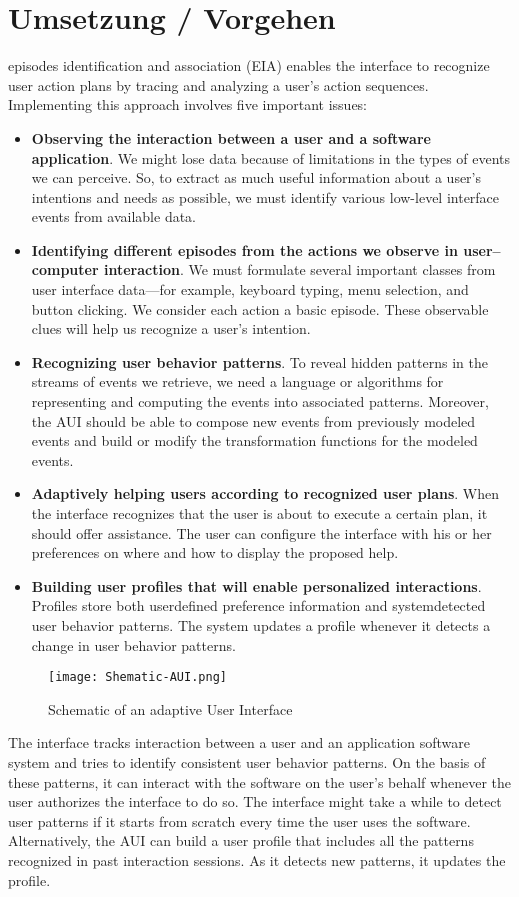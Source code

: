 \chapter{Umsetzung / Vorgehen}
episodes identification and association (EIA) enables the interface to recognize user action plans by tracing
and analyzing a user’s action sequences. Implementing this approach involves five important issues:
\begin{itemize}
    \item \textbf{Observing the interaction between a user and a software application}. We might lose data 
    because of limitations in the types of events we can perceive. So, to extract as much useful
    information about a user’s intentions and needs as possible, we must identify various low-level
    interface events from available data.
    \item \textbf{Identifying different episodes from the actions we observe in user–computer interaction}. We
    must formulate several important classes from user interface data—for example, keyboard
    typing, menu selection, and button clicking. We consider each action a basic episode. These
    observable clues will help us recognize a user’s intention.
    \item \textbf{Recognizing user behavior patterns}. To reveal hidden patterns in the streams of events we
    retrieve, we need a language or algorithms for representing and computing the events into
    associated patterns. Moreover, the AUI should be able to compose new events from previously
    modeled events and build or modify the transformation functions for the modeled events.
    \item \textbf{Adaptively helping users according to recognized user plans}. When the interface recognizes
    that the user is about to execute a certain plan, it should offer assistance. The user can configure
    the interface with his or her preferences on where and how to display the proposed help.
    \item \textbf{Building user profiles that will enable personalized interactions}. Profiles store both userdefined
    preference information and systemdetected user behavior patterns. The system updates a profile whenever it detects a change
    in user behavior patterns.
\end{itemize}

\begin{figure}[h]
    \centering
    \texttt{[image: Shematic-AUI.png]}
    \caption{Schematic of an adaptive User Interface}
\end{figure}
\newpage
The interface tracks interaction between a user and an application software system and tries to identify consistent user behavior patterns.
On the basis of these patterns, it can interact with the software on the user’s behalf whenever the user authorizes the interface to do
so. The interface might take a while to detect user patterns if it starts from scratch every time the user uses the software. Alternatively,
the AUI can build a user profile that includes all the patterns recognized in past interaction sessions. As it detects new patterns, it updates
the profile.